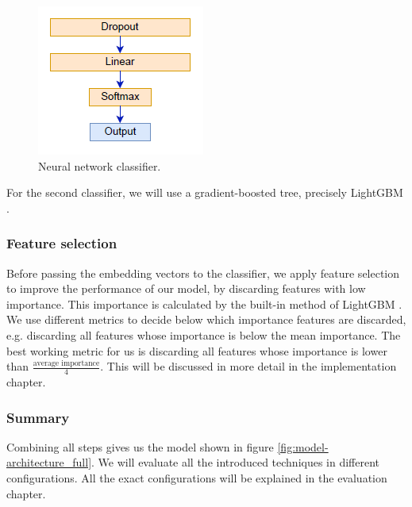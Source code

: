 \begin{figure}[h]
  \centering
  \includegraphics[scale=1]{fig/nn_1.png}
  \caption{Neural network classifier.}%
  \label{fig:nn1}
\end{figure}

For the second classifier, we will use a gradient-boosted tree, precisely LightGBM \cite{lgbm}.

\newpage

\subsubsection{Feature selection}
Before passing the embedding vectors to the classifier, we apply feature selection to improve the performance of our model, by discarding features with low importance. This importance is calculated by the built-in method of LightGBM \cite{lgbmimportance}. We use different metrics to decide below which importance features are discarded, e.g. discarding all features whose importance is below the mean importance. The best working metric for us is discarding all features whose importance is lower than $\frac{\text{average importance}}{4}$. This will be discussed in more detail in the implementation chapter.

\subsubsection{Summary}
Combining all steps gives us the model shown in figure \ref{fig:model-architecture_full}. We will evaluate all the introduced techniques in different configurations. All the exact configurations will be explained in the evaluation chapter.

